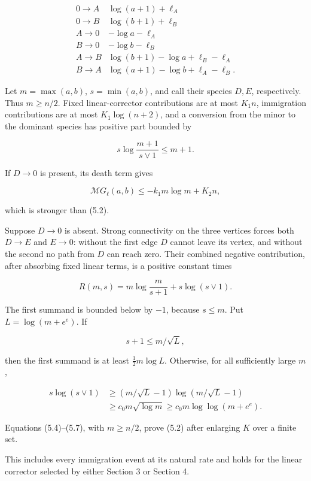 \[
\begin{array}{c|c}
0\to A&\log(a+1)+\ell_A\\
0\to B&\log(b+1)+\ell_B\\
A\to0&-\log a-\ell_A\\
B\to0&-\log b-\ell_B\\
A\to B&\log(b+1)-\log a+\ell_B-\ell_A\\
B\to A&\log(a+1)-\log b+\ell_A-\ell_B.
\end{array}
\tag{5.3}
\]

Let \(m=\max(a,b)\), \(s=\min(a,b)\), and call their species \(D,E\),
respectively. Thus \(m\ge n/2\). Fixed linear-corrector contributions
are at most \(K_1n\), immigration contributions are at most
\(K_1\log(n+2)\), and a conversion from the minor to the dominant
species has positive part bounded by

\[
 s\log\frac{m+1}{s\vee1}\le m+1.
\tag{5.4}
\]

If \(D\to0\) is present, its death term gives

\[
 \mathcal MG_\ell(a,b)\le-k_1m\log m+K_2n,
\tag{5.5}
\]

which is stronger than (5.2).

Suppose \(D\to0\) is absent. Strong connectivity on the three vertices
forces both \(D\to E\) and \(E\to0\): without the first edge \(D\)
cannot leave its vertex, and without the second no path from \(D\) can
reach zero. Their combined negative contribution, after absorbing fixed
linear terms, is a positive constant times

\[
 R(m,s)=m\log\frac{m}{s+1}+s\log(s\vee1).
\tag{5.6}
\]

The first summand is bounded below by \(-1\), because \(s\le m\). Put
\(L=\log(m+e^e)\). If

\[
 s+1\le m/\sqrt L,
\]

then the first summand is at least \(\frac12m\log L\). Otherwise, for
all sufficiently large \(m\),

\[
\begin{split}
 s\log(s\vee1)
 &\ge (m/\sqrt L-1)\log(m/\sqrt L-1)\\
 &\ge c_0m\sqrt{\log m}
 \ge c_0m\log\log(m+e^e).
\end{split}
\tag{5.7}
\]

Equations (5.4)--(5.7), with \(m\ge n/2\), prove (5.2) after enlarging
\(K\) over a finite set.

This includes every immigration event at its natural rate and holds for
the linear corrector selected by either Section 3 or Section 4.


